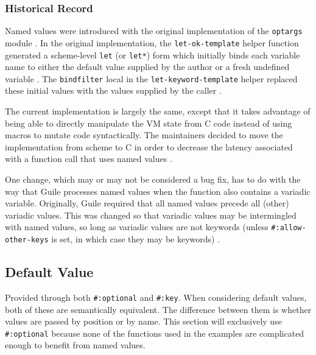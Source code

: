 \subsubsection{Historical Record}
Named values were introduced with the original implementation of the \texttt{optargs}
module \parencite[][NEWS lines 11451-11525]{guile-source}. 
In the original implementation, the \texttt{let-ok-template} helper function generated a
scheme-level \texttt{let} (or \texttt{let*}) form which initially binds each variable name
to either the default value supplied by the author or a fresh undefined variable
\parencite[][commit 7e01997e88c54216678271de36b1c2088377492d ice-9/optargs.scm lines 128-135]{guile-source}.
The \texttt{bindfilter} local in the \texttt{let-keyword-template} helper replaced these
initial values with the values supplied by the caller
\parencite[][commit 7e01997e88c54216678271de36b1c2088377492d ice-9/optargs.scm lines 152-168]{guile-source}.

The current implementation is largely the same, except that it takes advantage of
being able to directly manipulate the VM state from C code instead of using macros to
mutate code syntactically.
The maintainers decided to move the implementation from scheme to C in order to decrease
the latency associated with a function call that uses named values
\parencite[][2009-10 lines 10053-10056, 14008-14009, 14139-14141]{guile-devel-archive}.

One change, which may or may not be considered a bug fix, has to do with the way that
Guile processes named values when the function also contains a variadic variable.
Originally, Guile required that all named values precede all (other) variadic values.
This was changed so that variadic values may be intermingled with named values, so long
as variadic values are not keywords (unless \texttt{\#:allow-other-keys} is set, in which
case they may be keywords)
\parencite[][commit ff74e44ecba55f50b2c2c84bad2f13bed9489455]{guile-source}.

\subsection{Default Value}
Provided through both \texttt{\#:optional} and \texttt{\#:key}.
When considering default values, both of these are semantically equivalent.
The difference between them is whether values are passed by position or by name.
This section will exclusively use \texttt{\#:optional} because none of the functions used
in the examples are complicated enough to benefit from named values.

